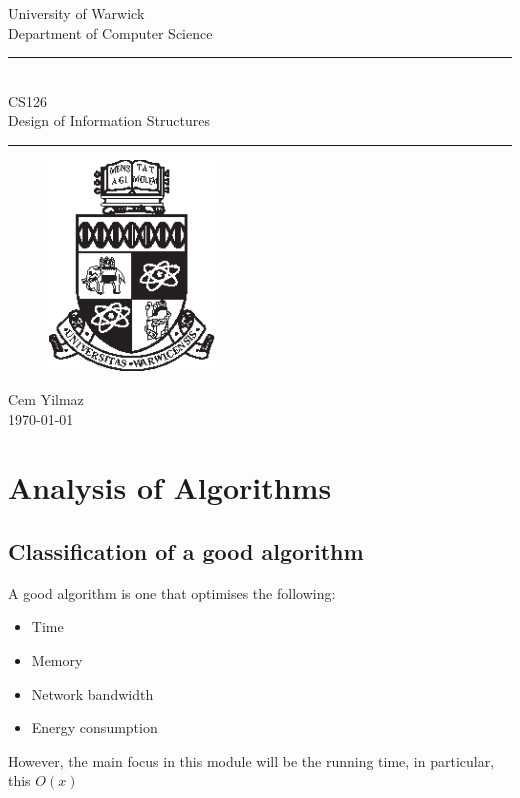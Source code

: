 \documentclass[a4paper]{article}
\theoremstyle{plain}
\theoremstyle{definition}
\theoremstyle{remark}
\begin{document}
	\begin{titlepage}
	\begin{center}
	\large
	University of Warwick \\
	Department of Computer Science \\
	\huge
	\vspace{50mm}
	\rule{\linewidth}{0.5pt} \\
	CS126 \\
	\vspace{5mm}
	\Large
	Design of Information Structures
	\rule{\linewidth}{0.5pt}
	\vspace{5mm}
	\begin{figure}[H]
	\centering
	\includegraphics[width=0.4\textwidth]{crest.eps}
	\end{figure}
	\vspace{37mm}
	Cem Yilmaz \\
	\today
	\end{center}
	\end{titlepage}	
	\newpage
\section{Analysis of Algorithms}
\subsection{Classification of a good algorithm}
A good algorithm is one that optimises the following:
\begin{itemize}
	\item Time
	\item Memory
	\item Network bandwidth
	\item Energy consumption
\end{itemize}
However, the main focus in this module will be the running time, in particular, this $O(x)$
\end{document}
